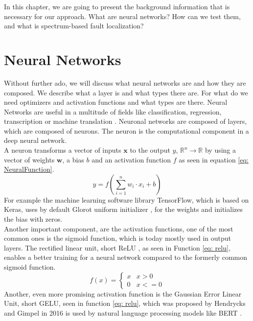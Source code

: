In this chapter, we are going to present the background information that is necessary for our approach.
What are neural networks?
How can we test them, and what is spectrum-based fault localization?
\section{Neural Networks}\label{sec:neural-networks}
Without further ado, we will discuss what neural networks are and how they are composed.
We describe what a layer is and what types there are.
For what do we need optimizers and activation functions and what types are there.
Neural Networks are useful in a multitude of fields like classification, regression, transcription or machine translation \cite{goodfellow_deep_2016}.
Neuronal networks are composed of layers, which are composed of neurons.
The neuron is the computational component in a deep neural network.\\
A neuron transforms a vector of inputs $\mathbf{x}$ to the output $y$, $\mathbb{R}^n \to \mathbb{R}$
by using a vector of weights $\mathbf{w}$, a bias $b$ and an activation function $f$ as seen in equation \ref{eq: NeuralFunction}.
\begin{equation}
    y = f\left( \sum^n_{i=1} w_i\cdot x_i + b\right)
    \label{eq: NeuralFunction}
\end{equation}
For example the machine learning software library TensorFlow, which is based on Keras, uses by default Glorot uniform initializer \cite{noauthor_tfkeraslayersdense_2023,glorot_understanding_2010}, for the weights and initializes the bias with zeros.\\
Another important component, are the activation functions, one of the most common ones is the sigmoid function, which is today mostly used in output layers.
The rectified linear unit, short ReLU \cite{fukushima_cognitron_1975,glorot_deep_2011}, as seen in Function \ref{eq: relu}, enables a better training for a neural network compared to the formerly common sigmoid function.
\begin{equation}
    f(x) =
    \begin{cases}
        x& x > 0\\
        0& x <= 0
    \end{cases}
    \label{eq: relu}
\end{equation}
Another, even more promising activation function is the Gaussian Error Linear Unit, short GELU, seen in function \ref{eq: relu}, which was proposed by Hendrycks and Gimpel in 2016 \cite{hendrycks_gaussian_2016} is used by natural language processing models like BERT \cite{devlin_bert_2019}.
